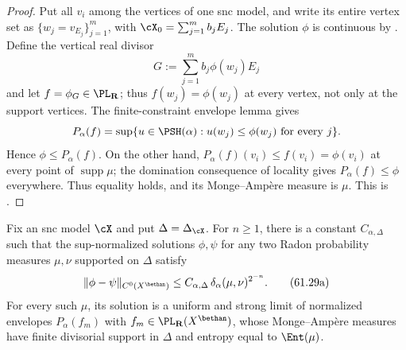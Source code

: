 \begin{proof}
Put all $v_i$ among the vertices of one snc model, and write its entire
vertex set as $\{w_j=v_{E_j}\}_{j=1}^m$, with
$\cX_0=\sum_{j=1}^m b_jE_j$.  The solution
$\phi$ is continuous by
.  Define the vertical real divisor
\[
                     G:=\sum_{j=1}^m b_j\phi(w_j)E_j
\]
and let $f=\phi_G\in\PL_{\mathbf R}$; thus
$f(w_j)=\phi(w_j)$ at every vertex, not only at the support vertices.
The finite-constraint envelope lemma \cite[Lemma~7.1.5]{MPWN25} gives
\[
 P_\alpha(f)=\sup\{u\in\PSH(\alpha):u(w_j)\leq\phi(w_j)
                                      \text{ for every }j\}.
\]
Hence $\phi\leq P_\alpha(f)$.  On the other hand,
$P_\alpha(f)(v_i)\leq f(v_i)=\phi(v_i)$ at every point of
$\operatorname{supp}\mu$; the domination consequence of locality gives
$P_\alpha(f)\leq\phi$ everywhere.  Thus equality holds, and its
Monge--Amp\`ere measure is $\mu$.  This is
\cite[Proposition~8.3.2]{MPWN25}.
\end{proof}

\noindent\begin{minipage}{\linewidth}
\begin{corollary}\label{cor:mpwn-fixed-complex-uniform-solutions}
Fix an snc model $\cX$ and put $\Delta=\Delta_{\cX}$. For $n\geq1$, there is a constant $C_{\alpha,\Delta}$ such that the sup-normalized solutions $\phi,\psi$ for any two Radon probability measures $\mu,\nu$ supported on $\Delta$ satisfy
\[
 \|\phi-\psi\|_{C^0(X^{\bethan})}
        \leq C_{\alpha,\Delta}\,
                         \delta_\alpha(\mu,\nu)^{2^{-n}}.
\tag{61.29a}\label{eq:mpwn-fixed-complex-uniform-bound}
\]
For every such $\mu$, its solution is a uniform and strong limit of normalized envelopes $P_\alpha(f_m)$ with $f_m\in\PL_{\mathbf R}(X^{\bethan})$, whose Monge--Amp\`ere measures have finite divisorial support in $\Delta$ and entropy equal to $\Ent(\mu)$.
\end{corollary}
\end{minipage}\par

